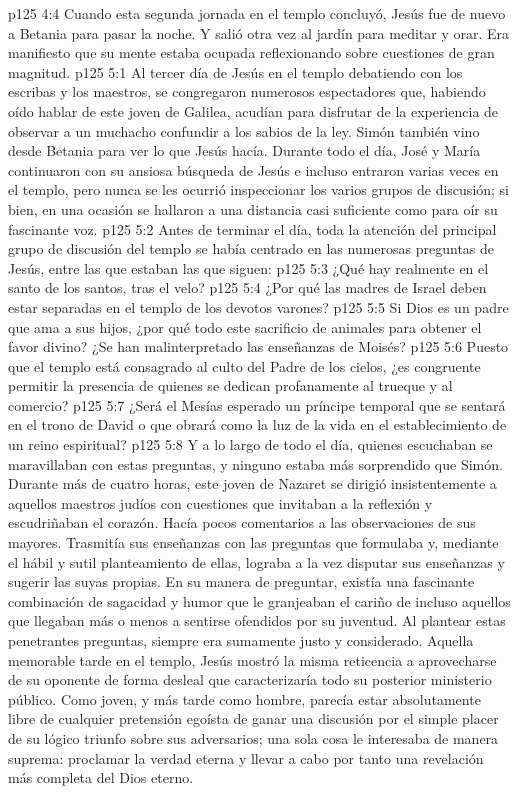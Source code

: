 \vs p125 4:4 Cuando esta segunda jornada en el templo concluyó, Jesús fue de nuevo a Betania para pasar la noche. Y salió otra vez al jardín para meditar y orar. Era manifiesto que su mente estaba ocupada reflexionando sobre cuestiones de gran magnitud.
\vs p125 5:1 Al tercer día de Jesús en el templo debatiendo con los escribas y los maestros, se congregaron numerosos espectadores que, habiendo oído hablar de este joven de Galilea, acudían para disfrutar de la experiencia de observar a un muchacho confundir a los sabios de la ley. Simón también vino desde Betania para ver lo que Jesús hacía. Durante todo el día, José y María continuaron con su ansiosa búsqueda de Jesús e incluso entraron varias veces en el templo, pero nunca se les ocurrió inspeccionar los varios grupos de discusión; si bien, en una ocasión se hallaron a una distancia casi suficiente como para oír su fascinante voz.
\vs p125 5:2 Antes de terminar el día, toda la atención del principal grupo de discusión del templo se había centrado en las numerosas preguntas de Jesús, entre las que estaban las que siguen:
\vs p125 5:3 ¿Qué hay realmente en el santo de los santos, tras el velo?
\vs p125 5:4 ¿Por qué las madres de Israel deben estar separadas en el templo de los devotos varones?
\vs p125 5:5 Si Dios es un padre que ama a sus hijos, ¿por qué todo este sacrificio de animales para obtener el favor divino? ¿Se han malinterpretado las enseñanzas de Moisés?
\vs p125 5:6 Puesto que el templo está consagrado al culto del Padre de los cielos, ¿es congruente permitir la presencia de quienes se dedican profanamente al trueque y al comercio?
\vs p125 5:7 ¿Será el Mesías esperado un príncipe temporal que se sentará en el trono de David o que obrará como la luz de la vida en el establecimiento de un reino espiritual?
\vs p125 5:8 \pc Y a lo largo de todo el día, quienes escuchaban se maravillaban con estas preguntas, y ninguno estaba más sorprendido que Simón. Durante más de cuatro horas, este joven de Nazaret se dirigió insistentemente a aquellos maestros judíos con cuestiones que invitaban a la reflexión y escudriñaban el corazón. Hacía pocos comentarios a las observaciones de sus mayores. Trasmitía sus enseñanzas con las preguntas que formulaba y, mediante el hábil y sutil planteamiento de ellas, lograba a la vez disputar sus enseñanzas y sugerir las suyas propias. En su manera de preguntar, existía una fascinante combinación de sagacidad y humor que le granjeaban el cariño de incluso aquellos que llegaban más o menos a sentirse ofendidos por su juventud. Al plantear estas penetrantes preguntas, siempre era sumamente justo y considerado. Aquella memorable tarde en el templo, Jesús mostró la misma reticencia a aprovecharse de su oponente de forma desleal que caracterizaría todo su posterior ministerio público. Como joven, y más tarde como hombre, parecía estar absolutamente libre de cualquier pretensión egoísta de ganar una discusión por el simple placer de su lógico triunfo sobre sus adversarios; una sola cosa le interesaba de manera suprema: proclamar la verdad eterna y llevar a cabo por tanto una revelación más completa del Dios eterno.
